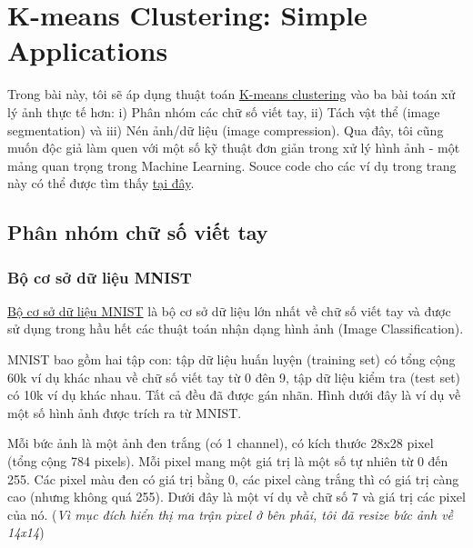 \chapter{K-means Clustering: Simple Applications}
Trong bài này, tôi sẽ áp dụng thuật toán \href{http://machinelearningcoban.com/2017/01/01/kmeans/}{K-means clustering} vào ba bài toán xử lý ảnh thực tế hơn: i) Phân nhóm các chữ số viết tay, ii) Tách vật thể (image segmentation) và iii) Nén ảnh/dữ liệu (image compression). Qua đây, tôi cũng muốn độc giả  làm quen với một số kỹ thuật đơn giản trong xử lý hình ảnh - một mảng quan trọng trong Machine Learning. Souce code cho các ví dụ trong trang này có thể được tìm thấy \href{https://github.com/tiepvupsu/tiepvupsu.github.io/blob/master/assets/kmeans/Kmeans2.ipynb}{tại đây}.  

 
\section{Phân nhóm chữ số viết tay }
 
\subsection{Bộ cơ sở dữ liệu MNIST }
\href{http://yann.lecun.com/exdb/mnist/}{Bộ cơ sở dữ liệu MNIST} là bộ cơ sở dữ liệu lớn nhất về chữ số viết tay và được sử dụng trong hầu hết các thuật toán nhận dạng hình ảnh (Image Classification).  
 
MNIST bao gồm hai tập con: tập dữ liệu huấn luyện (training set) có tổng cộng 60k ví dụ khác nhau về chữ số viết tay từ 0 đên 9, tập dữ liệu kiểm tra (test set) có 10k ví dụ khác nhau. Tất cả đều đã được gán nhãn. Hình dưới đây là ví dụ về một số hình ảnh được trích ra từ MNIST. 
 
 
Mỗi bức ảnh là một ảnh đen trắng (có 1 channel), có kích thước 28x28 pixel (tổng cộng 784 pixels). Mỗi pixel mang một giá trị là một số tự nhiên từ 0 đến 255. Các pixel màu đen có giá trị bằng 0, các pixel càng trắng thì có giá trị càng cao (nhưng không quá 255). Dưới đây là một ví dụ về chữ số 7 và giá trị các pixel của nó. (\textit{Vì mục đích hiển thị ma trận pixel ở bên phải, tôi đã resize bức ảnh về 14x14}) 
 
